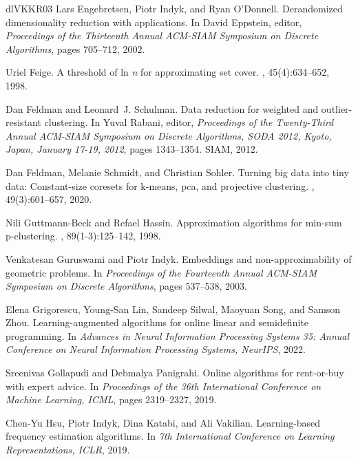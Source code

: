 \documentclass[10pt,a4paper]{amsart}
\begin{document}
\begin{thebibliography}{dlVKKR03}
Lars Engebretsen, Piotr Indyk, and Ryan O'Donnell.
\newblock Derandomized dimensionality reduction with applications.
\newblock In David Eppstein, editor, {\em Proceedings of the Thirteenth Annual {ACM-SIAM} Symposium on Discrete Algorithms}, pages 705--712, 2002.

Uriel Feige.
\newblock A threshold of ln \emph{n} for approximating set cover.
, 45(4):634--652, 1998.

Dan Feldman and Leonard~J. Schulman.
\newblock Data reduction for weighted and outlier-resistant clustering.
\newblock In Yuval Rabani, editor, {\em Proceedings of the Twenty-Third Annual {ACM-SIAM} Symposium on Discrete Algorithms, {SODA} 2012, Kyoto, Japan, January 17-19, 2012}, pages 1343--1354. {SIAM}, 2012.

Dan Feldman, Melanie Schmidt, and Christian Sohler.
\newblock Turning big data into tiny data: Constant-size coresets for k-means, pca, and projective clustering.
, 49(3):601--657, 2020.

Nili Guttmann{-}Beck and Refael Hassin.
\newblock Approximation algorithms for min-sum p-clustering.
, 89(1-3):125--142, 1998.

Venkatesan Guruswami and Piotr Indyk.
\newblock Embeddings and non-approximability of geometric problems.
\newblock In {\em Proceedings of the Fourteenth Annual {ACM-SIAM} Symposium on Discrete Algorithms}, pages 537--538, 2003.

Elena Grigorescu, Young{-}San Lin, Sandeep Silwal, Maoyuan Song, and Samson Zhou.
\newblock Learning-augmented algorithms for online linear and semidefinite programming.
\newblock In {\em Advances in Neural Information Processing Systems 35: Annual Conference on Neural Information Processing Systems, NeurIPS}, 2022.

Sreenivas Gollapudi and Debmalya Panigrahi.
\newblock Online algorithms for rent-or-buy with expert advice.
\newblock In {\em Proceedings of the 36th International Conference on Machine Learning, {ICML}}, pages 2319--2327, 2019.

Chen{-}Yu Hsu, Piotr Indyk, Dina Katabi, and Ali Vakilian.
\newblock Learning-based frequency estimation algorithms.
\newblock In {\em 7th International Conference on Learning Representations, {ICLR}}, 2019.


\end{thebibliography}
\end{document}
